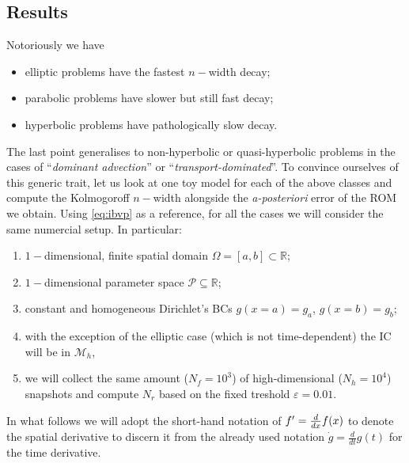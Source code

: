 \documentclass[../main.tex]{subfiles}
\begin{document}
\subsection{Results}\label{subsec:classical_results}

Notoriously we have
\begin{itemize}
     \item elliptic problems have the fastest $n-$width decay;
     \item parabolic problems have slower but still fast decay;
     \item hyperbolic problems have pathologically slow decay.
\end{itemize}

The last point generalises to non-hyperbolic or quasi-hyperbolic problems in the cases of ``\textit{dominant advection}'' or ``\textit{transport-dominated}''.
To convince ourselves of this generic trait, let us look at one toy model for each of the above classes and compute the Kolmogoroff $n-$width alongside the \textit{a-posteriori} error of the ROM we obtain.
Using \eqref{eq:ibvp} as a reference, for all the cases we will consider the same numercial setup. 
In particular:
\begin{enumerate}
        \item $1-$dimensional, finite spatial domain $\Omega=[a,b]\subset \mathbb{R}$;
     \item $1-$dimensional parameter space $\mathcal{P}\subseteq \mathbb{R}$;
     \item constant and homogeneous Dirichlet's BCs $g(x=a) = g_{a}$, $g(x=b) = g_{b}$;
     \item with the exception of the elliptic case (which is not time-dependent) the IC will be in $\mathcal{M}_{h}$,
     \item we will collect the same amount ($N_{f}=10^{3}$) of high-dimensional ($N_{h}=10^{4}$) snapshots and compute $N_{r}$ based on the fixed treshold $\varepsilon=0.01$.
\end{enumerate}
In what follows we will adopt the short-hand notation of $f'=\frac{d}{dx}f(x)$ to denote the spatial derivative to discern it from the already used notation $\dot{g} = \frac{d}{dt}g(t)$ for the time derivative.




\end{document}
